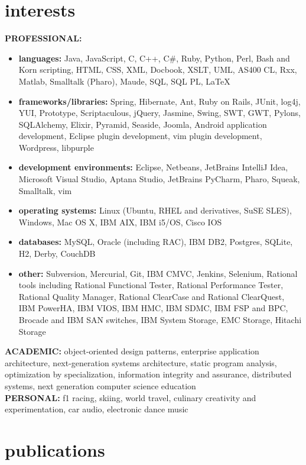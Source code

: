 \documentclass['print']{friggeri-cv} %
\begin{document}
\section{interests}

\textbf{PROFESSIONAL:} 
\begin{itemize}
\item \textbf{languages:} Java, JavaScript, C, C++, C\#, Ruby, Python, Perl, Bash and Korn scripting, HTML, CSS, XML, Docbook,
XSLT, UML, AS400 CL, Rxx, Matlab, Smalltalk (Pharo), Maude, SQL, SQL PL, \LaTeX
\item \textbf{frameworks/libraries:} Spring, Hibernate, Ant, Ruby on Rails, JUnit, log4j, YUI, Prototype, Scriptaculous, jQuery, Jasmine,
Swing, SWT, GWT, Pylons, SQLAlchemy, Elixir, Pyramid, Seaside, Joomla, Android application development, Eclipse plugin development, vim plugin development,
Wordpress, libpurple
\item \textbf{development environments:} Eclipse, Netbeans, JetBrains IntelliJ Idea, Microsoft Visual Studio, Aptana Studio, JetBrains PyCharm, Pharo, Squeak,
Smalltalk, vim
\item \textbf{operating systems:} Linux (Ubuntu, RHEL and derivatives, SuSE SLES), Windows, Mac OS X, IBM AIX, IBM i5/OS,
Cisco IOS
\item \textbf{databases:} MySQL, Oracle (including RAC), IBM DB2, Postgres, SQLite, H2, Derby, CouchDB
\item \textbf{other:} Subversion, Mercurial, Git, IBM CMVC, Jenkins, Selenium, Rational tools including Rational Functional Tester, Rational Performance
Tester, Rational Quality Manager, Rational ClearCase and Rational ClearQuest, IBM PowerHA, IBM VIOS, IBM HMC, IBM
SDMC, IBM FSP and BPC, Brocade and IBM SAN switches, IBM System Storage, EMC Storage, Hitachi Storage
\end{itemize}
\textbf{ACADEMIC:} object-oriented design patterns, enterprise application architecture, next-generation systems architecture, static program analysis, optimization by specialization, information integrity and assurance, distributed systems, next generation computer science education \\
\textbf{PERSONAL:} f1 racing, skiing, world travel, culinary creativity and experimentation, car audio, electronic dance music
\pagebreak

\section{publications}




\end{document}
